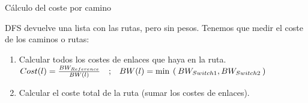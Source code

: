 \documentclass[10pt,spanish,xcolor={svgnames}]{beamer}
\begin{document}
\begin{frame}{Cálculo del coste por camino}
\vspace*{-2em}
\begin{exampleblock}{\large DFS devuelve una lista con las rutas, pero sin pesos.}
\vspace*{1em}
Tenemos que medir el coste de los caminos o rutas:
\begin{enumerate}
\item Calcular todos los costes de enlaces que haya en la ruta. $Cost(l) = \frac{BW_{Reference}}{BW(l)} \quad\mathrm{;}\quad BW(l) = \min\hspace{0.4em}(\hspace{0.2em}BW_{Switch1}, BW_{Switch2}\hspace{0.2em})$
\vspace{1em}
\item Calcular el coste total de la ruta (sumar los costes de enlaces).
\end{enumerate}
\end{exampleblock}
\end{frame}
\end{document}
